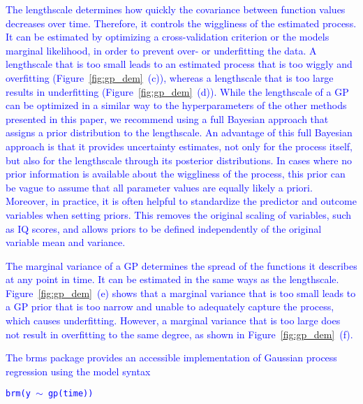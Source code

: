 \documentclass[man, floatsintext]{apa7}
\begin{document}
\textcolor{blue}{
  The lengthscale determines how quickly the covariance between function values
  decreases over time. Therefore, it controls the wiggliness of the estimated
  process. It can be estimated by optimizing a cross-validation criterion or
  the models marginal likelihood, in order to prevent over- or underfitting
  the data. A lengthscale that is too small leads to an estimated process that
  is too wiggly and overfitting (Figure~\ref{fig:gp_dem}~(c)), whereas a
  lengthscale that is too large results in underfitting
  (Figure~\ref{fig:gp_dem}~(d)). While the lengthscale of a GP can be optimized
  in a similar way to the hyperparameters of the other methods presented in
  this paper, we recommend using a full Bayesian approach that assigns a prior
  distribution to the lengthscale. An advantage of this full Bayesian approach
  is that it provides uncertainty estimates, not only for the process itself,
  but also for the lengthscale through its posterior distributions. In cases
  where no prior information is available about the wiggliness of the process,
  this prior can be vague to assume that all parameter values are equally
  likely a priori. Moreover, in practice, it is often helpful to standardize
  the predictor and outcome variables when setting priors. This removes the
  original scaling of variables, such as IQ scores, and allows priors to be
  defined independently of the original variable mean and variance.
}

\textcolor{blue}{
  The marginal variance of a GP determines the spread of the functions it
  describes at any point in time. It can be estimated in the same ways as the
  lengthscale. Figure~\ref{fig:gp_dem}~(e) shows that a marginal variance that
  is too small leads to a GP prior that is too narrow and unable to adequately
  capture the process, which causes underfitting. However, a marginal variance
  that is too large does not result in overfitting to the same degree, as shown
  in Figure~\ref{fig:gp_dem}~(f).
}

\textcolor{blue}{
  The brms package \parencite{burkner_brms_2017} provides an accessible
  implementation of
  Gaussian process regression using the model syntax}

\noindent
\textcolor{blue}{\fontsize{10}{12}\selectfont\texttt{brm(y $\sim$ gp(time))}}
\end{document}
